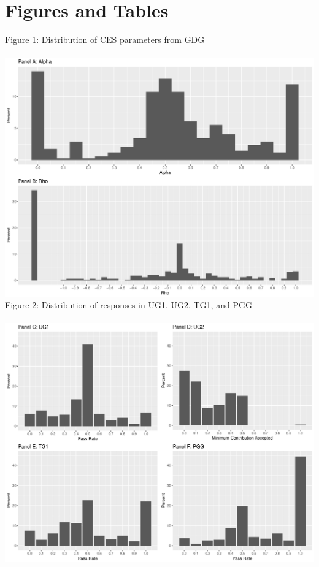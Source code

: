 \documentclass[12pt]{article}
\begin{document}
\newpage


\section{Figures and Tables} \label{app:d}

\noindent Figure 1: Distribution of CES parameters from GDG \\ \\
\includegraphics[scale=0.4]{Figure2a.pdf} \\



\noindent Figure 2: Distribution of responses in UG1, UG2, TG1, and PGG \\ \\
\includegraphics[scale=0.4]{Figure2b.pdf} \\
\end{document}
